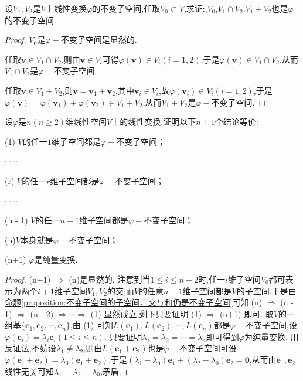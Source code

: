 \documentclass[../../main.tex]{subfiles}%
\begin{document}
\begin{proposition}\label{proposition:不变子空间的子空间、交与和仍是不变子空间}
设\(V_1,V_2\)是\(V\)上线性变换\(\varphi\)的不变子空间,任取$V_0\subset V$,求证:,$V_0$,\(V_1\cap V_2\),\(V_1 + V_2\)也是\(\varphi\)的不变子空间.
\end{proposition}
\begin{proof}
$V_0$是\(\varphi -\)不变子空间是显然的.

任取\(\boldsymbol{v}\in V_1\cap V_2\),则由\(\boldsymbol{v}\in V_i\)可得\(\varphi(\boldsymbol{v})\in V_i(i = 1,2)\),于是\(\varphi(\boldsymbol{v})\in V_1\cap V_2\),从而\(V_1\cap V_2\)是\(\varphi -\)不变子空间.

任取\(\boldsymbol{v}\in V_1 + V_2\),则\(\boldsymbol{v}=\boldsymbol{v}_1+\boldsymbol{v}_2\),其中\(\boldsymbol{v}_i\in V_i\),故\(\varphi(\boldsymbol{v}_i)\in V_i(i = 1,2)\),于是\(\varphi(\boldsymbol{v})=\varphi(\boldsymbol{v}_1)+\varphi(\boldsymbol{v}_2)\in V_1 + V_2\),从而\(V_1 + V_2\)是\(\varphi -\)不变子空间.
\end{proof}

\begin{proposition}\label{proposition:纯量变换关于不变子空间的等价条件}
设\(\varphi\)是\(n(n\geqslant  2)\)维线性空间\(V\)上的线性变换,证明以下\(n+1\)个结论等价:

(1) \(V\)的任一\(1\)维子空间都是\(\varphi -\)不变子空间；

\(\cdots\cdots\)

(r) \(V\)的任一\(r\)维子空间都是\(\varphi -\)不变子空间；

\(\cdots\cdots\)

(n - 1) \(V\)的任一\(n - 1\)维子空间都是\(\varphi -\)不变子空间；

(n)\(V\)本身就是\(\varphi -\)不变子空间；

(n+1) \(\varphi\)是纯量变换.
\end{proposition}
\begin{proof}
(n+1) \(\Rightarrow\) (n)是显然的.
注意到当\(1\leqslant  i\leqslant  n - 2\)时,任一\(i\)维子空间\(V_0\)都可表示为两个\(i + 1\)维子空间\(V_1,V_2\)的交;而$V$的任意$n-1$维子空间都是$V$的子空间.于是由\hyperref[proposition:不变子空间的子空间、交与和仍是不变子空间]{命题\ref{proposition:不变子空间的子空间、交与和仍是不变子空间}}可知:(n) \(\Rightarrow\) (n - 1) \(\Rightarrow\) (n - 2) \(\Rightarrow\cdots\Rightarrow\) (1) 显然成立,剩下只要证明 (1) \(\Rightarrow\) (n+1) 即可. 取\(V\)的一组基\(\{\boldsymbol{e}_1,\boldsymbol{e}_2,\cdots,\boldsymbol{e}_n\}\),由 (1) 可知$L\left( \boldsymbol{e}_1 \right) ,L\left( \boldsymbol{e}_2 \right) ,\cdots ,L\left( \boldsymbol{e}_n \right)$都是\(\varphi -\)不变子空间,设\(\varphi(\boldsymbol{e}_i)=\lambda_i\boldsymbol{e}_i(1\leqslant  i\leqslant  n)\). 只要证明\(\lambda_1=\lambda_2=\cdots=\lambda_n\)即可得到\(\varphi\)为纯量变换. 用反证法,不妨设\(\lambda_1\neq\lambda_2\),则由\(L(\boldsymbol{e}_1+\boldsymbol{e}_2)\)也是\(\varphi -\)不变子空间可设\(\varphi(\boldsymbol{e}_1+\boldsymbol{e}_2)=\lambda_0(\boldsymbol{e}_1+\boldsymbol{e}_2)\),于是\((\lambda_1 - \lambda_0)\boldsymbol{e}_1+(\lambda_2 - \lambda_0)\boldsymbol{e}_2=\boldsymbol{0}\),从而由$\boldsymbol{e}_1,\boldsymbol{e}_2$线性无关可知\(\lambda_1=\lambda_2=\lambda_0\),矛盾.
\end{proof}
\end{document}
